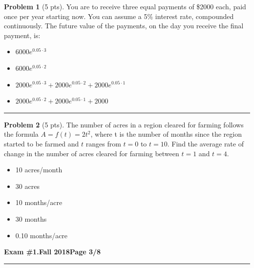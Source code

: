 \documentclass[12pt]{article}
\makeatletter
\theoremstyle{definition}
\newtheorem{problem}{Problem}
\newcommand*{\radiobutton}{%
  \@ifstar{\@radiobutton0}{\@radiobutton1}%
}
\newcommand*{\@radiobutton}[1]{%
  \begin{tikzpicture}
    \pgfmathsetlengthmacro\radius{height("X")/2}
    \draw[radius=\radius] circle;
    \ifcase#1 \fill[radius=.6*\radius] circle;\fi
  \end{tikzpicture}%
}
\makeatother
\begin{document}
\begin{problem}[5 pts]
  You are to receive three equal payments of \$2000 each, paid once per year starting now. You can assume a 5\% interest
  rate, compounded continuously. The future value of the payments, on the day you receive the final payment, is: 
  \begin{itemize}
  \item[\radiobutton] $6000 e^{0.05 \cdot 3}$
  \item[\radiobutton] $6000 e^{0.05 \cdot 2}$
  \item[\radiobutton] $2000 e^{0.05 \cdot 3} + 2000 e^{0.05 \cdot 2} + 2000 e^{0.05 \cdot 1}$
  \item[\radiobutton] $2000 e^{0.05 \cdot 2} + 2000 e^{0.05 \cdot 1} + 2000$
  \end{itemize}
\end{problem}
\hrule

\begin{problem}[5 pts]
  The number of acres in a region cleared for farming follows the formula $A = f (t) = 2t^2$, where t is the number of
  months since the region started to be farmed and $t$ ranges from $t = 0$ to $t = 10$. Find the average rate of change in
  the number of acres cleared for farming between $t = 1$ and $t = 4$.  
  \begin{itemize}
  \item[\radiobutton] 10 acres/month
  \item[\radiobutton] 30 acres
  \item[\radiobutton] 10 months/acre
  \item[\radiobutton] 30 months
  \item[\radiobutton] 0.10 months/acre
  \end{itemize}
\end{problem}

\newpage

\hfill{\large\bf Exam \#1.}\hfill{\large\bf  Fall 2018}\hfill{\large\bf Page 3/8}\hrule
\end{document}
